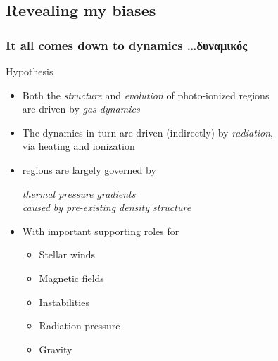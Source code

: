 \documentclass[presentation]{beamer}
\begin{document}
\subsection{Revealing my biases}


\begin{frame}
  \frametitle{It all comes down to dynamics \dots \textgreek{δυναμικός}}
  \begin{block}{Hypothesis}
    \begin{itemize}
    \item Both the \textit{structure} and \textit{evolution} of
      photo-ionized regions\\ are driven by \textit{gas dynamics}
    \item The dynamics in turn are driven (indirectly) by
      \textit{radiation},\\ via heating and ionization
    \item \hii{} regions are largely governed by
      \begin{center}\itshape
        \alert{thermal pressure gradients\\ caused by pre-existing
          density structure}
      \end{center}\smallskip
    \item With important supporting roles for
      \begin{itemize}
      \item Stellar winds
      \item Magnetic fields
      \item Instabilities
      \item Radiation pressure
      \item Gravity
      \end{itemize}
    \end{itemize}
  \end{block}
\end{frame}
\end{document}
